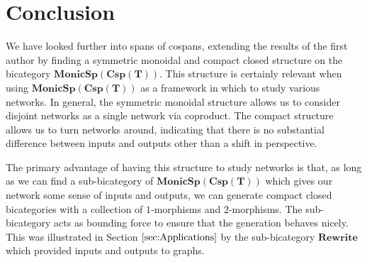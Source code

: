 \documentclass[11pt]{amsart}
\newcommand{\cat}[1]{\mathbf{#1}}
\newcommand{\bimonspcsp}[1]{\mathbf{MonicSp(Csp(#1))}}
\theoremstyle{remark}
\theoremstyle{definition}
\begin{document}
\section{Conclusion} %
\label{sec:Conclusion}

We have looked further into
spans of cospans, 
extending the results of
the first author \cite{Cic}
by finding a symmetric monoidal
and compact closed structure
on the bicategory $\bimonspcsp{T}$.
This structure is certainly relevant
when using $\bimonspcsp{T}$ as 
a framework in which to study
various networks.  In general,
the symmetric monoidal structure
allows us to consider disjoint networks
as a single network via coproduct.
The compact structure allows us 
to turn networks around, 
indicating that there is no
substantial difference between
inputs and outputs
other than a shift in perspective.  

The primary advantage of 
having this structure 
to study networks is that,
as long as we can find a sub-bicategory
of $\bimonspcsp{T}$
which gives our network
some sense of
inputs and outputs,
we can generate compact closed
bicategories with a collection
of $1$-morphisms and $2$-morphisms.
The sub-bicategory acts as 
bounding force to 
ensure that the generation
behaves nicely. 
This was illustrated
in Section $\ref{sec:Applications}$
by the sub-bicategory
$\cat{Rewrite}$
which provided inputs and outputs 
to graphs.


%
%
\end{document}
